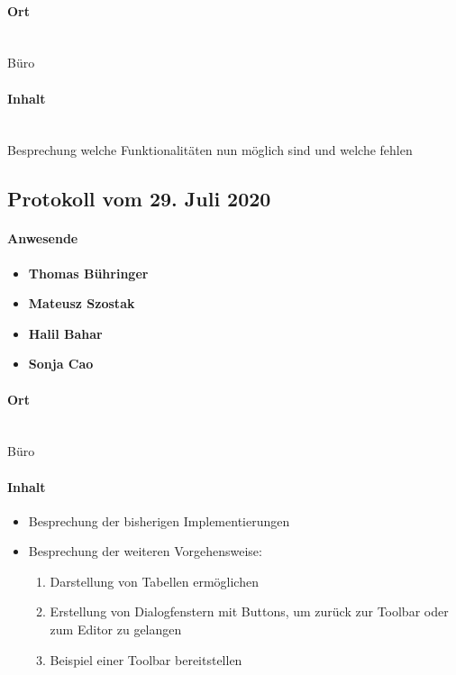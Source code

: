\paragraph{Ort}\mbox{}\\
Büro

\paragraph{Inhalt}\mbox{}\\
Besprechung welche Funktionalitäten nun möglich sind und welche fehlen

\subsection{Protokoll vom 29. Juli 2020}
\paragraph{Anwesende}
\begin{itemize}
	\item{\textbf{Thomas Bühringer}}
	\item{\textbf{Mateusz Szostak}}
	\item{\textbf{Halil Bahar}}
	\item{\textbf{Sonja Cao}}
\end{itemize}

\paragraph{Ort}\mbox{}\\
Büro

\paragraph{Inhalt}
\begin{itemize}
	\item Besprechung der bisherigen Implementierungen
	\item Besprechung der weiteren Vorgehensweise:
		\begin{enumerate}
			\item Darstellung von Tabellen ermöglichen
			\item Erstellung von Dialogfenstern mit Buttons, um zurück zur Toolbar oder zum Editor zu gelangen
			\item Beispiel einer Toolbar bereitstellen
		\end{enumerate}
\end{itemize}

